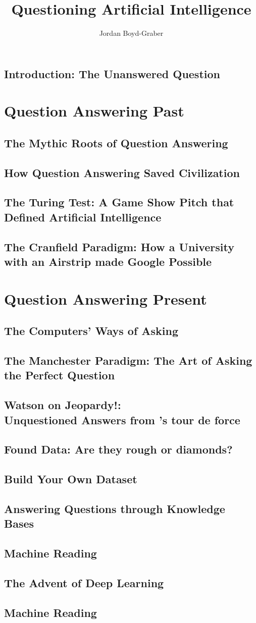 \documentclass[bfivepaper,twosided,justified,nobib]{style/tufte-book}
\title{Questioning Artificial Intelligence}
\author{Jordan Boyd-Graber}
\newif\ifproposal\proposalfalse
\newcommand{\proposalpart}[1]{
  \ifproposal
  \subsection{#1}
  \else
  \part{#1}
  \fi
}
\newcommand{\chapterfile}[3]{
  \ifproposal
  \paragraph{#3}
  
  \else
  \chapter{#3}
  \label{ch:#1}
  \begin{quote}
    
  \end{quote}
  
  \fi}
\begin{document}
\setcounter{secnumdepth}{0}

\ifproposal

\else

\tableofcontents

\fi








\chapterfile{010}{introduction}{Introduction: The Unanswered Question}

\ifproposal

\fi


\ifproposal

\else



\clearpage


\proposalpart{Question Answering Past}


\chapterfile{110}{epic}{The Mythic Roots of Question Answering}

\chapterfile{120}{civilization}{How Question Answering Saved Civilization}





\chapterfile{130}{turing}{The Turing Test: A Game Show Pitch that
  Defined Artificial Intelligence}

\chapterfile{140}{ir}{The Cranfield Paradigm: How a University with an
  Airstrip made Google Possible}

\proposalpart{Question Answering Present}

\chapterfile{200}{formats}{The Computers' Ways of Asking}

\chapterfile{240}{qb}{The Manchester Paradigm: The Art of Asking the
  Perfect Question}
\fi

\chapterfile{250}{watson}{Watson on Jeopardy!: \\ Unquestioned Answers from \abr{ibm}'s tour de force}

  \ifproposal

  \else
  
\chapterfile{260}{datasets_found}{Found  Data: Are they rough
  or diamonds?}
\chapterfile{262}{datasets_constructed}{Build Your Own Dataset}

\chapterfile{270}{methods_kb}{Answering Questions through Knowledge
  Bases}
\chapterfile{271}{methods_mr}{Machine Reading}
\chapterfile{272}{methods_deep_retrieval}{The Advent of Deep Learning}
\chapterfile{273}{methods_generation}{Machine Reading}
\end{document}
